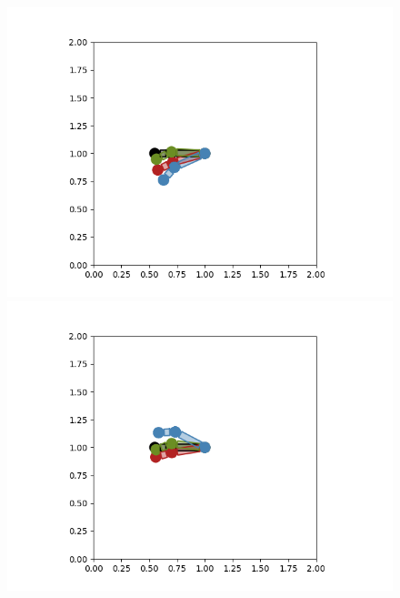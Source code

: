 \documentclass{article}
\begin{document}
\begin{figure}[htbp]
\begin{minipage}{0.45\textwidth}
    \includegraphics[width=\linewidth]{p1.2.ec1000.png}
    \caption{}
  \end{minipage}\hfill
  \begin{minipage}{0.45\textwidth}
    \includegraphics[width=\linewidth]{p1.2.ec2000.png}
    \caption{}
  \end{minipage}
\end{figure}
\end{document}
